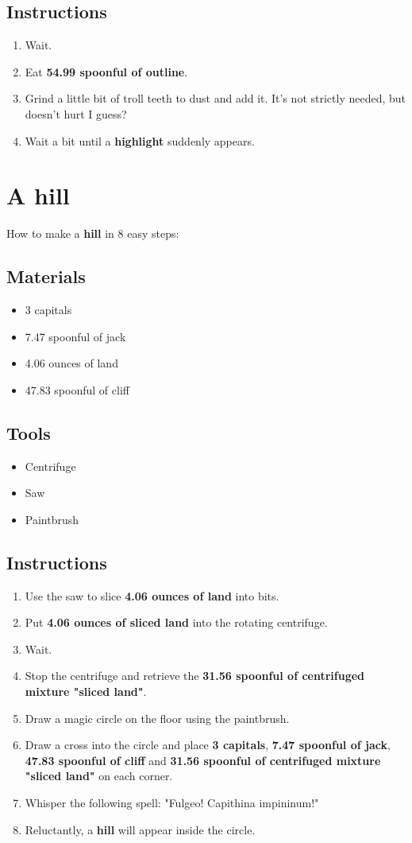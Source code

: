 \documentclass{article}
\begin{document}
\subsection{Instructions}\begin{enumerate}
\item 
Wait.
\item 
Eat \textbf{54.99 spoonful of outline}.
\item 
Grind a little bit of troll teeth to dust and add it. It's not strictly needed, but doesn't hurt I guess?
\item 
Wait a bit until a \textbf{highlight} suddenly appears.
\end{enumerate}
\newpage
\section{A hill}How to make a \textbf{hill} in 8 easy steps:

\subsection{Materials}\begin{itemize}
\item 
3 capitals
\item 
7.47 spoonful of jack
\item 
4.06 ounces of land
\item 
47.83 spoonful of cliff
\end{itemize}
\subsection{Tools}\begin{itemize}
\item 
Centrifuge
\item 
Saw
\item 
Paintbrush
\end{itemize}
\subsection{Instructions}\begin{enumerate}
\item 
Use the saw to slice \textbf{4.06 ounces of land} into bits.
\item 
Put \textbf{4.06 ounces of sliced land} into the rotating centrifuge.
\item 
Wait.
\item 
Stop the centrifuge and retrieve the \textbf{31.56 spoonful of centrifuged mixture "sliced land"}.
\item 
Draw a magic circle on the floor using the paintbrush.
\item 
Draw a cross into the circle and place \textbf{3 capitals}, \textbf{7.47 spoonful of jack}, \textbf{47.83 spoonful of cliff} and \textbf{31.56 spoonful of centrifuged mixture "sliced land"} on each corner.
\item 
Whisper the following spell: "Fulgeo! Capithina impininum!"
\item 
Reluctantly, a \textbf{hill} will appear inside the circle.
\end{enumerate}
\newpage
\end{document}
